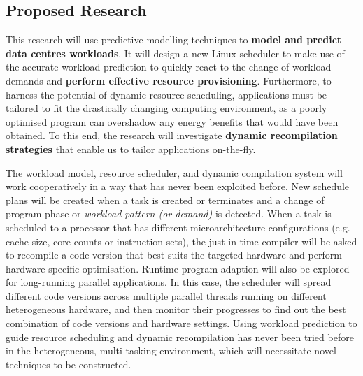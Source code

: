 \subsection{Proposed Research}
This research will use predictive modelling techniques to \textbf{model and predict data centres workloads}. It
will design a new Linux scheduler to make use of the accurate workload prediction to quickly react to
the change of workload demands and \textbf{perform effective resource provisioning}. Furthermore, to harness
the potential of dynamic resource scheduling, applications must be tailored to fit the drastically changing computing
environment, as a poorly optimised program can overshadow any energy benefits that would
have been obtained. To this end, the research will investigate \textbf{dynamic recompilation strategies} that enable us to
tailor applications on-the-fly.

The workload model, resource scheduler, and dynamic compilation system will work cooperatively in a way that has never been exploited before.
New schedule plans will be created when a task is created or terminates and a change of program phase or \emph{workload pattern (or demand)} is detected.
When a task is scheduled to a processor that has different microarchitecture configurations (e.g. cache size, core counts or instruction sets), the just-in-time compiler
will be asked to recompile a code version that best suits the targeted hardware and perform hardware-specific optimisation.
Runtime program adaption will also be explored for long-running parallel applications. In this case, the scheduler will spread different
code versions across multiple parallel threads running on different heterogeneous hardware, and then monitor their progresses to find
out the best combination of code versions and hardware settings. Using workload prediction to guide resource scheduling and
dynamic recompilation has never been tried before in the heterogeneous, multi-tasking environment,
which will necessitate novel techniques to be constructed.

